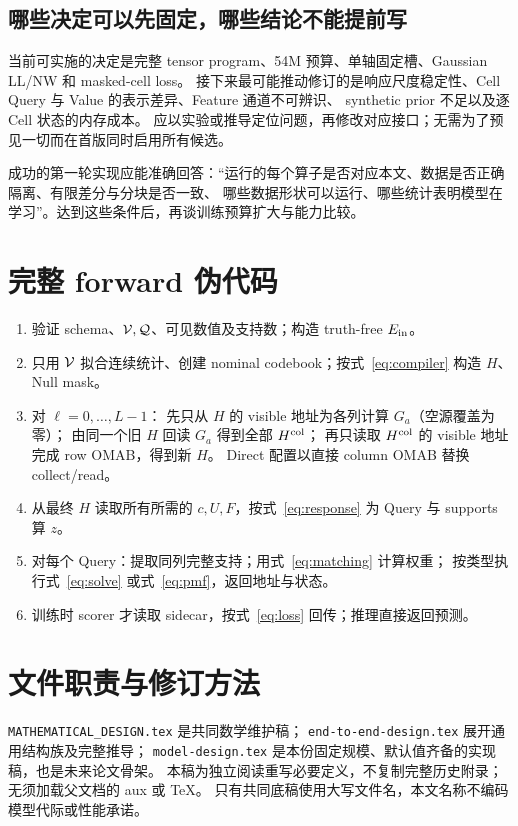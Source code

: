 \documentclass[11pt,UTF8,fontset=fandol]{ctexart}
\begin{document}
\subsection{哪些决定可以先固定，哪些结论不能提前写}
当前可实施的决定是完整 tensor program、54M 预算、单轴固定槽、Gaussian LL/NW 和 masked-cell loss。
接下来最可能推动修订的是响应尺度稳定性、Cell Query 与 Value 的表示差异、Feature 通道不可辨识、
synthetic prior 不足以及逐 Cell 状态的内存成本。
应以实验或推导定位问题，再修改对应接口；无需为了预见一切而在首版同时启用所有候选。

成功的第一轮实现应能准确回答：“运行的每个算子是否对应本文、数据是否正确隔离、有限差分与分块是否一致、
哪些数据形状可以运行、哪些统计表明模型在学习”。达到这些条件后，再谈训练预算扩大与能力比较。

\appendix
\section{完整 forward 伪代码}
\begin{enumerate}
\item 验证 schema、$\mathcal V,\mathcal Q$、可见数值及支持数；构造 truth-free $E_{\rm in}$。
\item 只用 $\mathcal V$ 拟合连续统计、创建 nominal codebook；按式~\eqref{eq:compiler} 构造 $H$、Null mask。
\item 对 $\ell=0,\ldots,L-1$：
先只从 $H$ 的 visible 地址为各列计算 $G_a$（空源覆盖为零）；
由同一个旧 $H$ 回读 $G_a$ 得到全部 $H^{\rm col}$；
再只读取 $H^{\rm col}$ 的 visible 地址完成 row OMAB，得到新 $H$。
Direct 配置以直接 column OMAB 替换 collect/read。
\item 从最终 $H$ 读取所有所需的 $c,U,F$，按式~\eqref{eq:response} 为 Query 与 supports 算 $z$。
\item 对每个 Query：提取同列完整支持；用式~\eqref{eq:matching} 计算权重；
按类型执行式~\eqref{eq:solve} 或式~\eqref{eq:pmf}，返回地址与状态。
\item 训练时 scorer 才读取 sidecar，按式~\eqref{eq:loss} 回传；推理直接返回预测。
\end{enumerate}

\section{文件职责与修订方法}
\texttt{MATHEMATICAL\_DESIGN.tex} 是共同数学维护稿；
\texttt{end-to-end-design.tex} 展开通用结构族及完整推导；
\texttt{model-design.tex} 是本份固定规模、默认值齐备的实现稿，也是未来论文骨架。
本稿为独立阅读重写必要定义，不复制完整历史附录；无须加载父文档的 aux 或 TeX。
只有共同底稿使用大写文件名，本文名称不编码模型代际或性能承诺。
\end{document}
